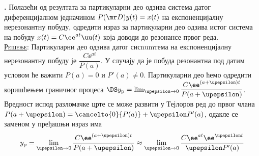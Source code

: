 \textbf{\ID.} Полазећи од резултата за партикуларни део одзива система датог диференцијалном једначином
$P(\mr D) y(t) = x(t)$ на експоненцијалну нерезонантну побуду, одредити израз за партикуларни део 
одзива истог система на побуду $x(t) = C\ee^{at}\uu(t)$ која доводи до резонансе првог реда. \\

\textsc{\underline{Решење}}: Партикуларни део одзива датог сисnumтема на експоненцијалну нерезонантну побуду
је $\dfrac{C\ee^{at}}{P(a)}$. У случају да је побуда резонантна под датим условом ће важити
$P(a) = 0$ и $P'(a) \neq 0$. Партикуларни део ћемо одредити коришћењем граничног процеса 
$\DS y_{\rm p} = \lim_{\upepsilon\to 0}\dfrac{C\ee^{(a+\upepsilon)t}}{P(a + \upepsilon)}$. 
Вредност испод разломачке црте се може развити у Тејлоров ред до првог члана 
$P(a+\upepsilon) = \cancelto{0}{P(a)} + \upepsilon P'(a)$, одакле се заменом у пређашњи 
израз има
\begin{equation}
    y_{\rm p} = \lim_{\upepsilon\to 0}\dfrac{C\ee^{(a+\upepsilon)t}}{P(a + \upepsilon)} \approx 
    \lim_{\upepsilon\to 0}\dfrac{C\ee^{a t} \ee^{\upepsilon t}}{\upepsilon P'(a) }
\end{equation}